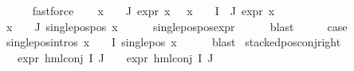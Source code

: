 \begin{isabellebody}
\ \ \ \ \isamarkupfalse%
\ fastforce\isanewline
\ \ \isamarkupfalse%
\ {\isacartoucheopen}{\isasymforall}x\ {\isasymin}\ {\isacharparenleft}{\kern0pt}{\isasymPhi}\ {\isacharbackquote}{\kern0pt}\ J{\isacharparenright}{\kern0pt}{\isachardot}{\kern0pt}\ expr{\isacharunderscore}{\kern0pt}{}\ x\ {\isasymle}\ {}{\isacartoucheclose}\ {\isacartoucheopen}{\isasymforall}x\ {\isasymin}\ {\isacharparenleft}{\kern0pt}{\isasymPhi}\ {\isacharbackquote}{\kern0pt}\ {\isacharparenleft}{\kern0pt}I\ {\isasymunion}\ J{\isacharparenright}{\kern0pt}{\isacharparenright}{\kern0pt}{\isachardot}{\kern0pt}\ expr{\isacharunderscore}{\kern0pt}{}\ x\ {\isasymle}\ {}{\isacartoucheclose}\isanewline
\ \ \isamarkupfalse%
\ {\isachardoublequoteopen}{\isasymforall}x\ {\isasymin}\ {\isacharparenleft}{\kern0pt}{\isasymPhi}\ {\isacharbackquote}{\kern0pt}\ J{\isacharparenright}{\kern0pt}{\isachardot}{\kern0pt}\ single{\isacharunderscore}{\kern0pt}pos{\isacharunderscore}{\kern0pt}pos\ x{\isachardoublequoteclose}\isanewline
\ \ \ \ \isamarkupfalse%
\ single{\isacharunderscore}{\kern0pt}pos{\isacharunderscore}{\kern0pt}pos{\isacharunderscore}{\kern0pt}expr\isanewline
\ \ \ \ \isamarkupfalse%
\ blast\isanewline
\ \ \isamarkupfalse%
\ \isamarkupfalse%
\ {\isacharquery}{\kern0pt}case\ \isamarkupfalse%
\ single{\isacharunderscore}{\kern0pt}pos{\isachardot}{\kern0pt}intros{\isacharparenleft}{\kern0pt}{}{\isacharparenright}{\kern0pt}\ {\isacartoucheopen}{\isasymforall}x\ {\isasymin}\ {\isacharparenleft}{\kern0pt}{\isasymPhi}\ {\isacharbackquote}{\kern0pt}\ I{\isacharparenright}{\kern0pt}{\isachardot}{\kern0pt}\ single{\isacharunderscore}{\kern0pt}pos\ x{\isacartoucheclose}\isanewline
\ \ \ \ \isamarkupfalse%
\ blast\isanewline
{}\isamarkupfalse%
%
\endisatagproof
{\isafoldproof}%
%
\isadelimproof
\isanewline
%
\endisadelimproof
\isanewline
{}\isamarkupfalse%
\ stacked{\isacharunderscore}{\kern0pt}pos{\isacharunderscore}{\kern0pt}conj{\isacharunderscore}{\kern0pt}right{\isacharcolon}{\kern0pt}\isanewline
\ \ \ {\isachardoublequoteopen}expr{\isacharunderscore}{\kern0pt}{}\ {\isacharparenleft}{\kern0pt}hml{\isacharunderscore}{\kern0pt}conj\ I\ J\ {\isasymPhi}{\isacharparenright}{\kern0pt}\ {\isasymle}\ {}{\isachardoublequoteclose}\ {\isachardoublequoteopen}expr{\isacharunderscore}{\kern0pt}{}\ {\isacharparenleft}{\kern0pt}hml{\isacharunderscore}{\kern0pt}conj\ I\ J\ {\isasymPhi}{\isacharparenright}{\kern0pt}\ {\isasymle}\ {}{\isachardoublequoteclose}\isanewline

\end{isabellebody}
